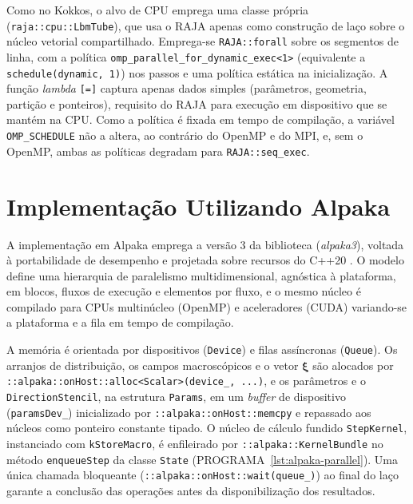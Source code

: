 Como no Kokkos, o alvo de CPU emprega uma classe própria (\texttt{raja::\allowbreak cpu::\allowbreak LbmTube}), que usa o RAJA apenas como construção de laço sobre o núcleo vetorial compartilhado.
Emprega-se \texttt{RAJA::\allowbreak forall} sobre os segmentos de linha, com a política \texttt{omp\_\allowbreak parallel\_\allowbreak for\_\allowbreak dynamic\_\allowbreak exec<1>} (equivalente a \texttt{schedule(dynamic, 1)}) nos passos e uma política estática na inicialização.
A função \textit{lambda} \texttt{[=]} captura apenas dados simples (parâmetros, geometria, partição e ponteiros), requisito do RAJA para execução em dispositivo que se mantém na CPU.
Como a política é fixada em tempo de compilação, a variável \texttt{OMP\_SCHEDULE} não a altera, ao contrário do OpenMP e do MPI, e, sem o OpenMP, ambas as políticas degradam para \texttt{RAJA::seq\_exec}.


\section{Implementação Utilizando Alpaka}\label{sec:implementacao-computacional-utilizando-alpaka}

A implementação em Alpaka emprega a versão 3 da biblioteca (\textit{alpaka3}), voltada à portabilidade de desempenho e projetada sobre recursos do C++20 \parencite{Zenker2016, Matthes2017, AlpakaContributors2026}.
O modelo define uma hierarquia de paralelismo multidimensional, agnóstica à plataforma, em blocos, fluxos de execução e elementos por fluxo, e o mesmo núcleo é compilado para CPUs multinúcleo (OpenMP) e aceleradores (CUDA) variando-se a plataforma e a fila em tempo de compilação.

A memória é orientada por dispositivos (\texttt{Device}) e filas assíncronas (\texttt{Queue}).
Os arranjos de distribuição, os campos macroscópicos e o vetor $\boldsymbol{\xi}$ são alocados por \texttt{::\allowbreak alpaka::\allowbreak onHost::\allowbreak alloc<Scalar>\allowbreak(device\_, ...)}, e os parâmetros e o \texttt{Direction\allowbreak Stencil}, na estrutura \texttt{Params}, em um \textit{buffer} de dispositivo (\texttt{params\allowbreak Dev\_}) inicializado por \texttt{::\allowbreak alpaka::\allowbreak onHost::\allowbreak memcpy} e repassado aos núcleos como ponteiro constante tipado.
O núcleo de cálculo fundido \texttt{StepKernel}, instanciado com \texttt{kStoreMacro}, é enfileirado por \texttt{::alpaka::KernelBundle} no método \texttt{enqueueStep} da classe \texttt{State} (PROGRAMA~\ref{lst:alpaka-parallel}).
Uma única chamada bloqueante (\texttt{::alpaka::\allowbreak onHost::\allowbreak wait(queue\_)}) ao final do laço garante a conclusão das operações antes da disponibilização dos resultados.

